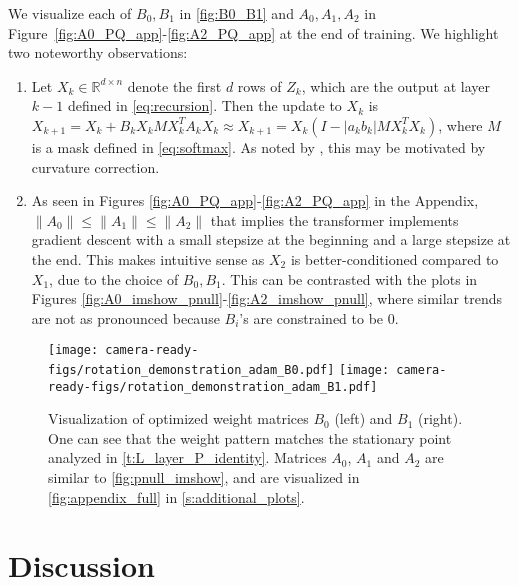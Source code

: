 \documentclass{article}
\newcommand{\R}{\mathbb{R}}
\renewcommand{\aa}{M}
\newcommand*\lrp[1]{\left( #1 \right)}
\begin{document}

We visualize each of $B_0,B_1$ in \autoref{fig:B0_B1} and $A_0,A_1,A_2$ in Figure~\ref{fig:A0_PQ_app}-\ref{fig:A2_PQ_app} at the end of training. We highlight two noteworthy observations:
\begin{enumerate}
\item Let $X_k\in \R^{d\times n}$ denote the first $d$ rows of $Z_k$, which are the output at layer $k-1$ defined in \eqref{eq:recursion}. Then the update to $X_k$ is $X_{k+1} = X_k + B_k X_k \aa X_k^T A_k X_k \approx X_{k+1} = X_k \lrp{I - |a_kb_k| \aa X_k^T X_k}$, where $\aa$ is a mask defined in \eqref{eq:softmax}. As noted by \cite{von2022transformers}, this may be motivated by curvature correction. 
\item As seen in Figures \ref{fig:A0_PQ_app}-\ref{fig:A2_PQ_app} in the Appendix, $\| A_0\| \leq \| A_1\| \leq \| A_2\|$ that implies the transformer implements gradient descent with a small stepsize at the beginning and a large stepsize at the end. This makes intuitive sense as $X_2$ is better-conditioned compared to $X_1$, due to the choice of $B_0,B_1$. This can be contrasted with the plots in Figures \eqref{fig:A0_imshow_pnull}-\eqref{fig:A2_imshow_pnull}, where similar trends are not as pronounced because $B_i$'s are constrained to be $0$.
\end{enumerate}
 

 

\begin{figure}
\centering  
\texttt{[image: camera-ready-figs/rotation\_demonstration\_adam\_B0.pdf]}
\texttt{[image: camera-ready-figs/rotation\_demonstration\_adam\_B1.pdf]} 
\vspace{-10pt}
\caption{Visualization of optimized weight matrices $B_0$ (left) and $B_1$ (right). One can see that the weight pattern matches the stationary point analyzed in \autoref{t:L_layer_P_identity}. Matrices $A_0$, $A_1$ and $A_2$ are similar to \autoref{fig:pnull_imshow}, and are visualized in \autoref{fig:appendix_full} in \autoref{s:additional_plots}.}
\label{fig:B0_B1}
\end{figure}




\section{Discussion} 
\end{document}
